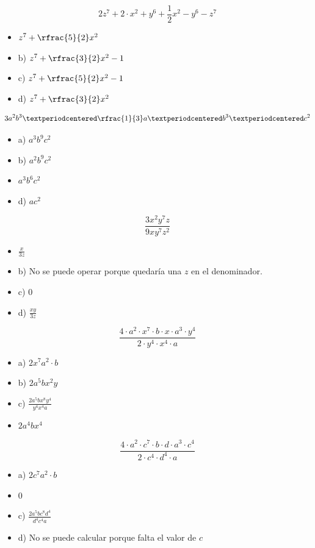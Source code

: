 \[
	2z^7 + 2·x^2 + y^6 + \frac{1}{2}x^2 - y^6 -z^7
\]

\begin{itemize}
	\item {} $z^7 + \rfrac{5}{2}x^2$
	\item b) $z^7 + \rfrac{3}{2}x^2 - 1$
	\item c) $z^7 + \rfrac{5}{2}x^2 - 1$
	\item d) $z^7 + \rfrac{3}{2}x^2$
\end{itemize}


\[
	3a^2b^3 · \rfrac{1}{3}a·b^3·c^2
\]

\begin{itemize}
	\item a) $a^3b^9c^2$
	\item b) $a^2b^9c^2$
	\item {} $a^3b^6c^2$
	\item d) $ac^2$
\end{itemize}


\[
	\frac{3x^2y^7z}{9xy^7z^2}
\]

\begin{itemize}
	\item {} $\frac{x}{3z}$
	\item b) No se puede operar porque quedaría una $z$ en el denominador.
	\item c) $0$
	\item d) $\frac{xy}{3z}$
\end{itemize}


\[
	\frac{4·a^2·x^7·b·x·a^3·y^4}{2·y^4·x^4·a}
\]

\begin{itemize}
	\item a) $2x^7a^2·b$
	\item b) $2a^5bx^2y$
	\item c) $\frac{2a^5bx^8y^4}{y^4x^4a}$
	\item {} $2a^4bx^4$
\end{itemize}


\[
	\frac{4·a^2·c^7·b·d·a^3·c^4}{2·c^4·d^4·a}
\]

\begin{itemize}
	\item a) $2c^7a^2·b$
	\item {} $0$
	\item c) $\frac{2a^5bc^8d^4}{d^4c^4a}$
	\item d) No se puede calcular porque falta el valor de $c$
\end{itemize}

